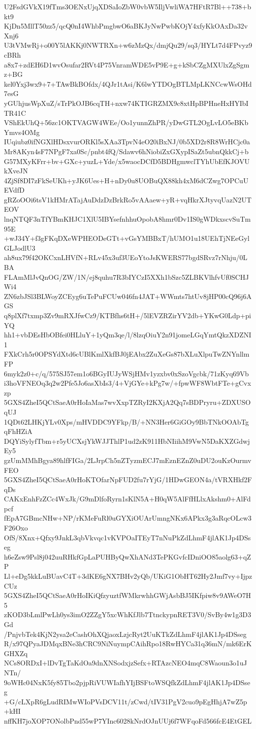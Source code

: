 U2FsdGVkX19fTms3OENxUjqXDSaIoZbW0vbW5IljVwliWA7HFtR7Bl++738+bkt9
KjDn5MllT50zz5/qcQ0nI4WhbPmgbwO6aBKJyNwPwbKOjY4xfyKkOAxDa32vXnj6
U3tVMwRj+o00Y5lAKKj0NWTRXn+w6zMzQx/dmjQu29/sq3/HYLt7d4FPvyz9cBRh
a8x7+zdEH6D1wvOsufar2RVt4P75VnramWDE5vP9E+g+kSbCZgMXUlxZgSgmz+BG
kel0Yxj3wx9+7+TAwBkBOfdx/4QJr1tAsi/K6lwYTDOgBTLMpLKNCcwWsOHd7esG
yGUhjusWpXuZ/sTrPkOJB6cqTH+nxw74KTIGRZMX9c8xtHpBPHneHxHYIbITR41C
VShEkUhQ+56zc1OKTVAGW4WEe/Oo1yunnZhPR/yDwGTL2OgLvLO5eBKbYmvs4OMg
IUqiubz0ifNGXlHDsxvurORKl5sXAa3TpvN4eO20iBxNJ/0b5XD2r8R8WrHCjc0a
Mr8AKyn4sF7NPgF7xa0Sc/pnbt4fQ/Sdawv6hNiobiZxGXypISaZt5ubnQkkCj+b
G57MXyKFrr+bv+GXc+yuzL+Yde/x5waocDCfD5BDHgmwclTYhUbEfKJOVUkXveJN
4ZjSf8DI7zFkSeUKh+yJK6Ues+H+nDy0u8UOBuQX88kh4xM6dCZwg7OPCuUEVdfD
gRZoOOi6tsV1kHMrATajAuDdzDzBrkRo5vAAaew+yR+vqHkrXJtyvqUazN2UTEOV
lnqNTQF3nTfYBmKHJC1XlU5IBYsefnhhuOpobA8hmr0Dv1IS0gWDkxscvSuTm95E
+wJ34Y+f3gFKqDXeWPHEODeGTt+vGsYMBBxT/hUMO1u18UEhTjNEeGylGLJodlU3
ah8ux79f42OKCxnLHVfN+RLv45x3uf3UEoYtoJsKWERS77bgdSRvz7rNhju/0LBA
FLAmMlJvQnOG/ZW/1N/ej8quhu7R3bIYCzI5XXh1bSzc5ZLBKVlhfvUf0SCHJWi4
ZN6zbJSl3BLWoyZCEyg6uTePuFCUw046fn4JAT+WWmts7htUv8jHP00cQ96j6AGS
q8plXf7txmp3Zv9mRXJfwCz9/KTBfhs6tH+/5lEVZRZirYV2db+YKwG0Ldp+piYQ
hh1+vbDEsHbOBfei0HLluY+1yQm3qe/l/8lzqOiuY2n91jomeLGqYmtQkzXDZNI1
FXkCrh5r0OPSYdXtd6cUBlKmlXkfBJ0jEAbx2ZuXeGs87bXLuXlpuTwZNYnllmFP
6myk2z0+c/q/575SJ57em1o6BGyIUJyWSjHMv1yzxbv0xSzoVgcbk/71zKyq69Vb
i3hoVFNEOq3q2w2Pfe5Jo6asXbIs3/4+VjGYe+kPg7w/+fpwWF8WbtFTe+gCvxzp
5GXS4ZheI5QCtSaeA0rHoIaMas7wvXxpTZRyI2KXjA2Qq7sBDPryru+ZDXUSOqUJ
1QDt62LHKjYLv0Xps/mHVDDC9YFkp/B/+NN3Her6GiGOy9BbTNkOOAbTgqFhHZiA
DQYiSylyfTbm+r5yUCXsjYkWJJThlP1ud2zK911HbNIiihM9VwN5DaKXZGdwjEy5
gzUmMMhBgya89hlfFIGa/2LJrpCh5nZTyzmECJ7mEznEZnZ0uDU2ouKzOurmvFEO
5GXS4ZheI5QCtSaeA0rHoKTOfarNpFUD2fu7rYjG/1HDwGEON4a/tVRXHkf2FqDs
CAKxEnhFzZCc4WxJk/G9mDlfoRyrn1sKlN5A+H0qW5AlFfHLlxAkshm0+AlFdpcf
fEpA7GBmcNHw+NP/rKMeFuRl0uGYXiOUArUmngNKx6APkx3g3aRqcOLcw3F26Oxo
OfS/8Xnx+Qfxy9JnkL3qbVkvqc1vKVPOaITEyT7nNuPkZdLhmF4jlAK1Jp4DSseg
h6eZsw9Psl8j042uuRHkfGpLaPUHByQwXhANd3TePKGvfcIDniOO85aolg63+qZP
Ll+eDg5kkLuBUavC4T+3dKE6gNX7BHv2yQb/UKiG1ObHT62Hy2Jmf7vy+IjpzCUz
5GXS4ZheI5QCtSaeA0rHoIKiQfzyuztfWMkrwhhGWjAsbBJ5IKfpiw8v9AWeO7H5
zKOD3bLmlPwLh0ys3imO2ZZgY5xcWhKfJlb7TtnckypnRET3V0/SvBy4w1g3D3Gd
/PnjvbTek4KjN2ysa2eCashOhXQjaoxLzjcRyt2UuKTkZdLhmF4jlAK1Jp4DSseg
R/x97QPyaJDMqxBNe3hCRC9NiNuympCAihRpo18RwHYCa31q36mN/mk6ErKGHXZq
NCs8ORDxI+lDvTgTaKdOa9dnXNSodxjzSefx+RTAzcNEO4mqC8Waoun3o1uJNTn/
9oWHc04NxK5fy85Tbo2pjpRiVUWIafhYIjBSFtoWSQfkZdLhmF4jlAK1Jp4DSseg
+G/cLXpR6gLudRIMwWIoPVsDCV11t/zCwd/tIV31PgV2cuo9pEgHhjA7wZ5p+kHI
nffKH7joXOP7ONolbPnd55wP7YInc6028kNrdOJnUUj6f7WFqoFd566fcE4EtGEL
